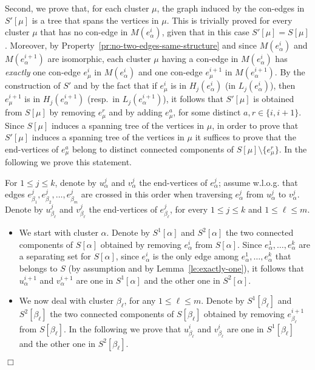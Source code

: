 \documentclass[letter,runningheads]{llncs}
\renewenvironment{proof}
{{\em Proof.\ }}{\hspace*{\fill}$\Box$\par\vspace{2mm}}
\begin{document}
\begin{proof}
Second, we prove that, for each cluster $\mu$, the graph induced by the con-edges in $S'[\mu]$ is a tree that spans the vertices in $\mu$. This is trivially proved for every cluster $\mu$ that has no con-edge in $M(e^i_{\alpha})$, given that in this case $S'[\mu]=S[\mu]$. Moreover, by Property~\ref{pr:no-two-edges-same-structure} and since $M(e^i_{\alpha})$ and $M(e^{i+1}_{\alpha})$ are isomorphic, each cluster $\mu$ having a con-edge in $M(e^i_{\alpha})$ has {\em exactly} one con-edge $e^i_{\mu}$ in $M(e^i_{\alpha})$ and one con-edge $e^{i+1}_{\mu}$ in $M(e^{i+1}_{\alpha})$. By the construction of $S'$ and by the fact that if $e^i_{\mu}$ is in $H_j(e^i_{\alpha})$ (in $L_j(e^i_{\alpha})$), then $e^{i+1}_{\mu}$ is in $H_j(e^{i+1}_{\alpha})$ (resp.\ in $L_j(e^{i+1}_{\alpha})$), it follows that $S'[\mu]$ is obtained from $S[\mu]$ by removing $e^r_{\mu}$ and by adding $e^a_{\mu}$, for some distinct $a,r\in\{i,i+1\}$. Since $S[\mu]$ induces a spanning tree of the vertices in $\mu$, in order to prove that $S'[\mu]$ induces a spanning tree of the vertices in $\mu$ it suffices to prove that the end-vertices of $e^a_{\mu}$ belong to distinct connected components of $S[\mu]\setminus \{e^r_{\mu}\}$. In the following we prove this statement.

For $1\leq j\leq k$, denote by $u^j_\alpha$ and $v^j_\alpha$ the end-vertices of $e^j_\alpha$; assume w.l.o.g. that edges $e^j_{\beta_1},e^j_{\beta_2},\dots,e^j_{\beta_m}$ are crossed in this order when traversing $e^j_\alpha$ from $u^j_\alpha$ to $v^j_\alpha$. Denote by $u^j_{\beta_\ell}$ and $v^j_{\beta_\ell}$ the end-vertices of $e^j_{\beta_\ell}$, for every $1\leq j\leq k$ and $1\leq \ell\leq m$.

\begin{itemize}
\item We start with cluster $\alpha$. Denote by $S^1[\alpha]$ and $S^2[\alpha]$ the two connected components of $S[\alpha]$ obtained by removing $e^i_\alpha$ from $S[\alpha]$. Since $e^1_\alpha,\dots,e^{k}_\alpha$ are a separating set for $S[\alpha]$, since $e^i_\alpha$ is the only edge among $e^1_\alpha,\dots,e^{k}_\alpha$ that belongs to $S$ (by assumption and by Lemma~\ref{le:exactly-one}), it follows that $u^{i+1}_\alpha$ and $v^{i+1}_\alpha$ are one in $S^1[\alpha]$ and the other one in $S^2[\alpha]$.


\item We now deal with cluster $\beta_\ell$, for any $1\leq \ell\leq m$. Denote by $S^1[\beta_\ell]$ and $S^2[\beta_\ell]$ the two connected components of $S[\beta_\ell]$ obtained by removing $e^{i+1}_{\beta_\ell}$ from $S[\beta_\ell]$. In the following we prove that $u^i_{\beta_\ell}$ and $v^i_{\beta_\ell}$ are one in $S^1[\beta_\ell]$ and the other one in $S^2[\beta_\ell]$.


\end{itemize}
\end{proof}
\end{document}
